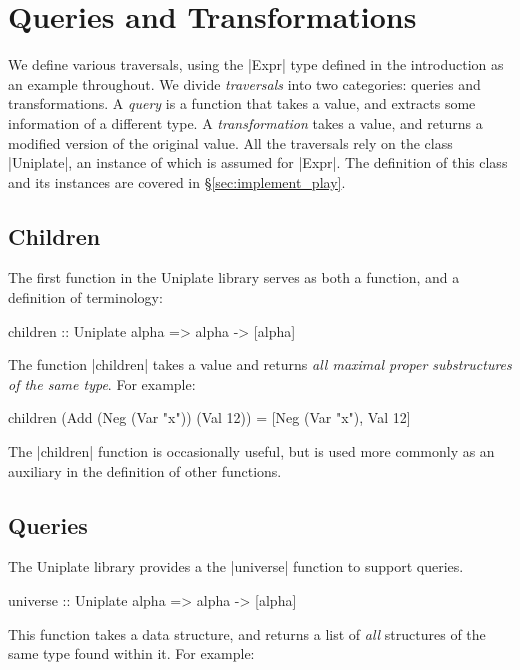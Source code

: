 \section{Queries and Transformations}
\label{sec:use_play}

We define various traversals, using the |Expr| type defined in the introduction as an example throughout. We divide \textit{traversals} into two categories: queries and transformations. A \textit{query} is a function that takes a value, and extracts some information of a different type. A \textit{transformation} takes a value, and returns a modified version of the original value. All the traversals rely on the class |Uniplate|, an instance of which is assumed for |Expr|. The definition of this class and its instances are covered in \S\ref{sec:implement_play}.

\subsection{Children}

The first function in the Uniplate library serves as both a function, and a definition of terminology:

\begin{code}
children :: Uniplate alpha => alpha -> [alpha]
\end{code}

The function |children| takes a value and returns \textit{all maximal proper substructures of the same type}. For example:

\begin{code}
children (Add (Neg (Var "x")) (Val 12)) =
    [Neg (Var "x"), Val 12]
\end{code}

The |children| function is occasionally useful, but is used more commonly as an auxiliary in the definition of other functions.


\subsection{Queries}

The Uniplate library provides a the |universe| function to support queries.

\begin{code}
universe :: Uniplate alpha => alpha -> [alpha]
\end{code}

This function takes a data structure, and returns a list of \textit{all} structures of the same type found within it. For example:

